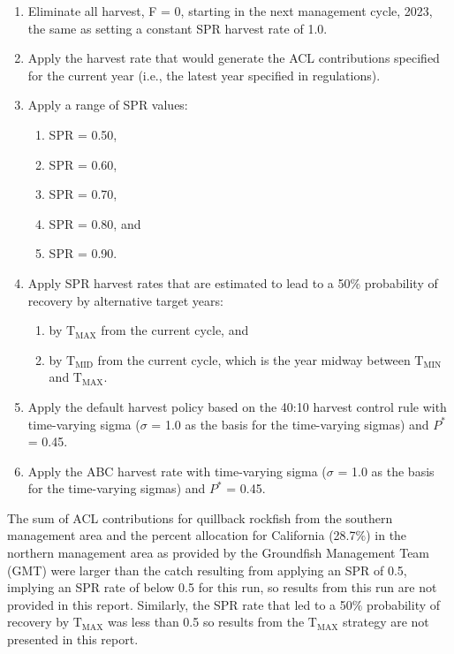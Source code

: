 \documentclass[11pt,
  english,
  letterpaper,
]{article}
\begin{document}
\leavevmode\tagmcend\tagstructend\par

\begin{enumerate}
    \item Eliminate all harvest, F = 0, starting in the next management cycle, 2023, the same as setting a constant SPR harvest rate of 1.0.
    \item Apply the harvest rate that would generate the ACL contributions specified for the current year (i.e., the latest year specified in regulations). 
    \item Apply a range of SPR values: 
    \begin{enumerate}
     \item SPR = 0.50,
     \item SPR = 0.60,
     \item SPR = 0.70,
     \item SPR = 0.80, and
     \item SPR = 0.90. 
    \end{enumerate}
    \item Apply SPR harvest rates that are estimated to lead to a 50$\%$ probability of recovery by alternative target years: 
    \begin{enumerate}
     \item by $\text{T}_\text{MAX}$ from the current cycle, and 
     \item by $\text{T}_\text{MID}$ from the current cycle, which is the year midway between $\text{T}_\text{MIN}$ and $\text{T}_\text{MAX}$.
    \end{enumerate}
    \item Apply the default harvest policy based on the 40:10 harvest control rule with time-varying sigma ($\sigma$ = 1.0 as the basis for the time-varying sigmas) and $P^*$ = 0.45.
    \item Apply the ABC harvest rate with time-varying sigma ($\sigma$ = 1.0 as the basis for the time-varying sigmas) and $P^*$ = 0.45.
\end{enumerate}


The sum of ACL contributions for quillback rockfish from the southern management area and the percent allocation for California (28.7{\(\%\)\leavevmode\tagmcend\tagstructend}) in the northern management area as provided by the Groundfish Management Team (GMT) were larger than the catch resulting from applying an SPR of 0.5, implying an SPR rate of below 0.5 for this run, so results from this run are not provided in this report. Similarly, the SPR rate that led to a 50{\(\%\)\leavevmode\tagmcend\tagstructend} probability of recovery by {\(\text{T}_\text{MAX}\)\leavevmode\tagmcend\tagstructend} was less than 0.5 so results from the {\(\text{T}_\text{MAX}\)\leavevmode\tagmcend\tagstructend} strategy are not presented in this report.
\end{document}
